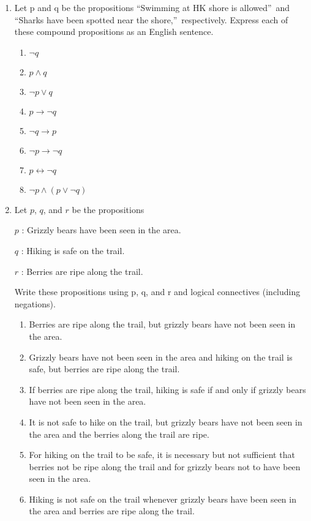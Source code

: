 \documentclass{sig-alternate-05-2015}
\begin{document}
\begin{enumerate}
\item Let p and q be the propositions \textquotedblleft Swimming at HK shore is allowed\textquotedblright\ and \textquotedblleft Sharks have been spotted
near the shore,\textquotedblright\ respectively. Express each of these compound
propositions as an English sentence.
\begin{enumerate}
	\item $\neg q$
	\item $p \wedge q$
	\item $\neg p \vee q$
	\item $p \rightarrow \neg q$
	\item $\neg q \rightarrow p$
	\item $\neg p \rightarrow \neg q$
	\item $p \leftrightarrow \neg q$
	\item $\neg p \wedge (p \vee \neg q)$
\end{enumerate}

\item Let $p$, $q$, and $r$ be the propositions

$p$ : Grizzly bears have been seen in the area.

$q$ : Hiking is safe on the trail.

$r$ : Berries are ripe along the trail.

Write these propositions using p, q, and r and logical
connectives (including negations).
\begin{enumerate}
\item Berries are ripe along the trail, but grizzly bears have
not been seen in the area.
\item Grizzly bears have not been seen in the area and hiking
on the trail is safe, but berries are ripe along the
trail.
\item If berries are ripe along the trail, hiking is safe if and
only if grizzly bears have not been seen in the area.
\item It is not safe to hike on the trail, but grizzly bears have
not been seen in the area and the berries along the trail
are ripe.
\item For hiking on the trail to be safe, it is necessary but not
sufficient that berries not be ripe along the trail and
for grizzly bears not to have been seen in the area.
\item Hiking is not safe on the trail whenever grizzly bears
have been seen in the area and berries are ripe along
the trail.
\end{enumerate}


\end{enumerate}
\end{document}
